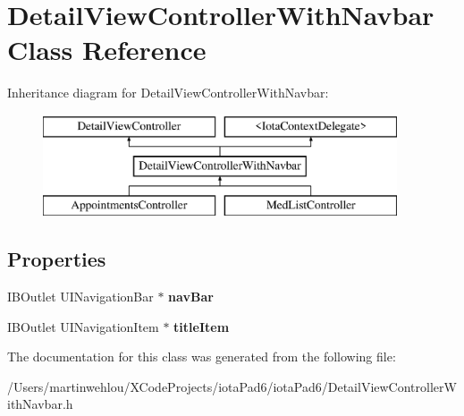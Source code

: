 \hypertarget{interface_detail_view_controller_with_navbar}{
\section{DetailViewControllerWithNavbar Class Reference}
\label{interface_detail_view_controller_with_navbar}
}
Inheritance diagram for DetailViewControllerWithNavbar:\begin{figure}[H]
\begin{center}
\leavevmode
\includegraphics[height=3.000000cm]{interface_detail_view_controller_with_navbar}
\end{center}
\end{figure}
\subsection*{Properties}
\begin{DoxyCompactItemize}
\item 
\hypertarget{interface_detail_view_controller_with_navbar_a5d92ae98155ab7166cda94982a0caf11}{
IBOutlet UINavigationBar $\ast$ {\bfseries navBar}}
\label{interface_detail_view_controller_with_navbar_a5d92ae98155ab7166cda94982a0caf11}

\item 
\hypertarget{interface_detail_view_controller_with_navbar_a1322177cddff319a61d0a02a185069ce}{
IBOutlet UINavigationItem $\ast$ {\bfseries titleItem}}
\label{interface_detail_view_controller_with_navbar_a1322177cddff319a61d0a02a185069ce}

\end{DoxyCompactItemize}


The documentation for this class was generated from the following file:\begin{DoxyCompactItemize}
\item 
/Users/martinwehlou/XCodeProjects/iotaPad6/iotaPad6/DetailViewControllerWithNavbar.h\end{DoxyCompactItemize}
